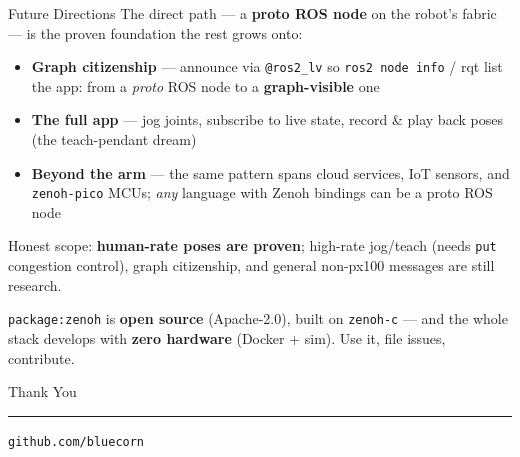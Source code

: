 \documentclass[9pt]{beamer}
\begin{document}
\begin{frame}{Future Directions}
  The direct path --- a \textbf{proto ROS node} on the robot's fabric --- is the proven foundation the rest grows onto:
  \begin{itemize}
    \item \textbf{Graph citizenship} --- announce via \texttt{@ros2\_lv} so \texttt{ros2 node info} / rqt list the app: from a \emph{proto} ROS node to a \textbf{graph-visible} one
    \item \textbf{The full app} --- jog joints, subscribe to live state, record \& play back poses (the teach-pendant dream)
    \item \textbf{Beyond the arm} --- the same pattern spans cloud services, IoT sensors, and \texttt{zenoh-pico} MCUs; \emph{any} language with Zenoh bindings can be a proto ROS node
  \end{itemize}

  \vspace{0.2em}
  {\small \alert{Honest scope:} \textbf{human-rate poses are proven}; high-rate jog/teach (needs \texttt{put} congestion control), graph citizenship, and general non-px100 messages are still research.}

  \vspace{0.4em}
  \begin{center}
    {\small \texttt{package:zenoh} is \textbf{open source} (Apache-2.0), built on \texttt{zenoh-c} --- and the whole stack develops with \textbf{zero hardware} (Docker + sim). Use it, file issues, contribute.}
  \end{center}
\end{frame}

\begin{frame}[standout]
  \centering
  \bluecornlogo[1.6cm]\par
  \vspace{0.8em}
  {Thank You\par}
  \vspace{0.5em}
  {\color{m3DarkPrimary}\rule{0.3\textwidth}{1.2pt}\par}
  \vspace{1.0em}
  {\small\texttt{github.com/bluecorn} \par}
\end{frame}
\end{document}
